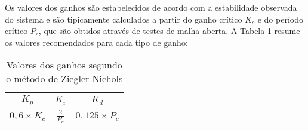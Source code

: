 Os valores dos ganhos são estabelecidos de acordo com a estabilidade observada do sistema e são tipicamente calculados a partir do ganho crítico \( K_c \) e do período crítico \( P_c \), que são obtidos através de testes de malha aberta. A Tabela \ref{tab:ziegler-nichols} resume os valores recomendados para cada tipo de ganho:

\begin{table}[h]
    \centering
    \begin{tabular}{ccc}
        \hline
        \( K_p \)            & \( K_i \)                      & \( K_d \)              \\
        \hline
        \( 0,6 \times K_c \) & \( \frac{2}{P_c} \) & \( 0,125 \times P_c \) \\
        \hline
    \end{tabular}
    \caption{Valores dos ganhos segundo o método de Ziegler-Nichols}
    \label{tab:ziegler-nichols}
\end{table}








